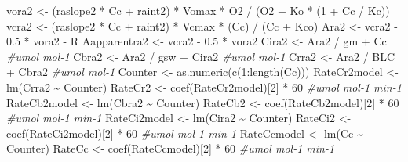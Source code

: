 \documentclass[
]{krantz}
\makeatletter
\newenvironment{Shaded}{\begin{snugshade}}{\end{snugshade}}
\newcommand{\CommentTok}[1]{\textcolor[rgb]{0.56,0.35,0.01}{\textit{#1}}}
\newcommand{\DecValTok}[1]{\textcolor[rgb]{0.00,0.00,0.81}{#1}}
\newcommand{\FloatTok}[1]{\textcolor[rgb]{0.00,0.00,0.81}{#1}}
\newcommand{\FunctionTok}[1]{\textcolor[rgb]{0.00,0.00,0.00}{#1}}
\newcommand{\NormalTok}[1]{#1}
\newcommand{\OtherTok}[1]{\textcolor[rgb]{0.56,0.35,0.01}{#1}}
\newcommand{\SpecialCharTok}[1]{\textcolor[rgb]{0.00,0.00,0.00}{#1}}
\newenvironment{kframe}{%
\medskip{}
\setlength{\fboxsep}{.8em}
 \def\at@end@of@kframe{}%
 \ifinner\ifhmode%
  \def\at@end@of@kframe{\end{minipage}}%
  \begin{minipage}{\columnwidth}%
 \fi\fi%
 \def\FrameCommand##1{\hskip\@totalleftmargin \hskip-\fboxsep
 \colorbox{shadecolor}{##1}\hskip-\fboxsep
     \hskip-\linewidth \hskip-\@totalleftmargin \hskip\columnwidth}%
 \MakeFramed {\advance\hsize-\width
   \@totalleftmargin\z@ \linewidth\hsize
   \@setminipage}}%
 {\par\unskip\endMakeFramed%
 \at@end@of@kframe}
\renewenvironment{Shaded}{\begin{kframe}}{\end{kframe}}
\makeatother
\begin{document}
\begin{Shaded}
\begin{Highlighting}[]
\NormalTok{vora2 }\OtherTok{\textless{}{-}}
\NormalTok{  (raslope2 }\SpecialCharTok{*}\NormalTok{ Cc }\SpecialCharTok{+}\NormalTok{ raint2) }\SpecialCharTok{*}\NormalTok{ Vomax }\SpecialCharTok{*}\NormalTok{ O2 }\SpecialCharTok{/}\NormalTok{ (O2 }\SpecialCharTok{+}\NormalTok{ Ko }\SpecialCharTok{*}\NormalTok{ (}\DecValTok{1} \SpecialCharTok{+}\NormalTok{ Cc }\SpecialCharTok{/}\NormalTok{ Kc)) }
\NormalTok{vcra2 }\OtherTok{\textless{}{-}}\NormalTok{ (raslope2 }\SpecialCharTok{*}\NormalTok{ Cc }\SpecialCharTok{+}\NormalTok{ raint2) }\SpecialCharTok{*}\NormalTok{ Vcmax }\SpecialCharTok{*}\NormalTok{ (Cc) }\SpecialCharTok{/}\NormalTok{ (Cc }\SpecialCharTok{+}\NormalTok{ Kco) }
\NormalTok{Ara2 }\OtherTok{\textless{}{-}}\NormalTok{ vcra2 }\SpecialCharTok{{-}} \FloatTok{0.5} \SpecialCharTok{*}\NormalTok{ vora2 }\SpecialCharTok{{-}}\NormalTok{ R }
\NormalTok{Aapparentra2 }\OtherTok{\textless{}{-}}\NormalTok{ vcra2 }\SpecialCharTok{{-}} \FloatTok{0.5} \SpecialCharTok{*}\NormalTok{ vora2 }
\NormalTok{Cira2 }\OtherTok{\textless{}{-}}\NormalTok{ Ara2 }\SpecialCharTok{/}\NormalTok{ gm }\SpecialCharTok{+}\NormalTok{ Cc }\CommentTok{\#umol mol{-}1}
\NormalTok{Cbra2 }\OtherTok{\textless{}{-}}\NormalTok{ Ara2 }\SpecialCharTok{/}\NormalTok{ gsw }\SpecialCharTok{+}\NormalTok{ Cira2 }\CommentTok{\#umol mol{-}1}
\NormalTok{Crra2 }\OtherTok{\textless{}{-}}\NormalTok{ Ara2 }\SpecialCharTok{/}\NormalTok{ BLC }\SpecialCharTok{+}\NormalTok{ Cbra2 }\CommentTok{\#umol mol{-}1}
\NormalTok{Counter }\OtherTok{\textless{}{-}} \FunctionTok{as.numeric}\NormalTok{(}\FunctionTok{c}\NormalTok{(}\DecValTok{1}\SpecialCharTok{:}\FunctionTok{length}\NormalTok{(Cc)))}
\NormalTok{RateCr2model }\OtherTok{\textless{}{-}} \FunctionTok{lm}\NormalTok{(Crra2 }\SpecialCharTok{\textasciitilde{}}\NormalTok{ Counter)}
\NormalTok{RateCr2 }\OtherTok{\textless{}{-}} \FunctionTok{coef}\NormalTok{(RateCr2model)[}\DecValTok{2}\NormalTok{] }\SpecialCharTok{*} \DecValTok{60} \CommentTok{\#umol mol{-}1 min{-}1}
\NormalTok{RateCb2model }\OtherTok{\textless{}{-}} \FunctionTok{lm}\NormalTok{(Cbra2 }\SpecialCharTok{\textasciitilde{}}\NormalTok{ Counter)}
\NormalTok{RateCb2 }\OtherTok{\textless{}{-}} \FunctionTok{coef}\NormalTok{(RateCb2model)[}\DecValTok{2}\NormalTok{] }\SpecialCharTok{*} \DecValTok{60} \CommentTok{\#umol mol{-}1 min{-}1}
\NormalTok{RateCi2model }\OtherTok{\textless{}{-}} \FunctionTok{lm}\NormalTok{(Cira2 }\SpecialCharTok{\textasciitilde{}}\NormalTok{ Counter)}
\NormalTok{RateCi2 }\OtherTok{\textless{}{-}} \FunctionTok{coef}\NormalTok{(RateCi2model)[}\DecValTok{2}\NormalTok{] }\SpecialCharTok{*} \DecValTok{60} \CommentTok{\#umol mol{-}1 min{-}1}
\NormalTok{RateCcmodel }\OtherTok{\textless{}{-}} \FunctionTok{lm}\NormalTok{(Cc }\SpecialCharTok{\textasciitilde{}}\NormalTok{ Counter)}
\NormalTok{RateCc }\OtherTok{\textless{}{-}} \FunctionTok{coef}\NormalTok{(RateCcmodel)[}\DecValTok{2}\NormalTok{] }\SpecialCharTok{*} \DecValTok{60} \CommentTok{\#umol mol{-}1 min{-}1}


\end{Highlighting}
\end{Shaded}
\end{document}
